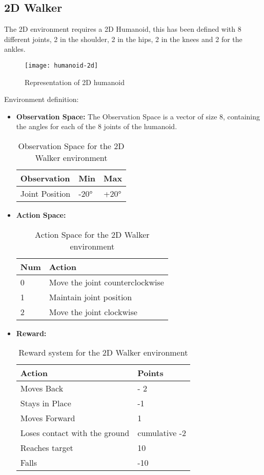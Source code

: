 \subsection{2D Walker}
The 2D environment requires a 2D Humanoid, this has been defined with 8 different joints, 2 in the shoulder, 2 in the hips, 2 in the knees and 2 for the ankles.
\begin{figure}[H]
    \centering
    \texttt{[image: humanoid-2d]}
    \caption{Representation of 2D humanoid}
\end{figure}

Environment definition:
\begin{itemize}
    \item \textbf{Observation Space:} The Observation Space is a vector of size 8, containing the angles for each of the 8 joints of the humanoid.
    \begin{table}[H]
        \caption{Observation Space for the 2D Walker environment}
        \centering
        \begin{tabular}{|l|l|l|}
        \hline
        Observation           & Min  & Max  \\ \hline
        Joint Position         & -20° & +20° \\ \hline

        \end{tabular}
        \end{table}

    \item \textbf{Action Space:} 
    \begin{table}[H]
        \caption{Action Space for the 2D Walker environment}
        \centering
        \begin{tabular}{|l|l|}
        \hline
        Num & Action                 \\ \hline
        0   & Move the joint counterclockwise  \\ \hline
        1   & Maintain joint position \\ \hline
        2   & Move the joint clockwise \\ \hline
        \end{tabular}
        \end{table}
    \item \textbf{Reward:} 
    \begin{table}[H]
        \caption{Reward system for the 2D Walker environment}
        \centering
        \begin{tabular}{|l|l|}
        \hline
        Action & Points                 \\ \hline
        Moves Back   &  - 2  \\ \hline
        Stays in Place   & -1 \\ \hline
        Moves Forward   & 1 \\ \hline
        Loses contact with the ground & cumulative -2 \\ \hline
        Reaches target & 10 \\ \hline
        Falls & -10 \\ \hline
        \end{tabular}
        \end{table}
    

\end{itemize}

